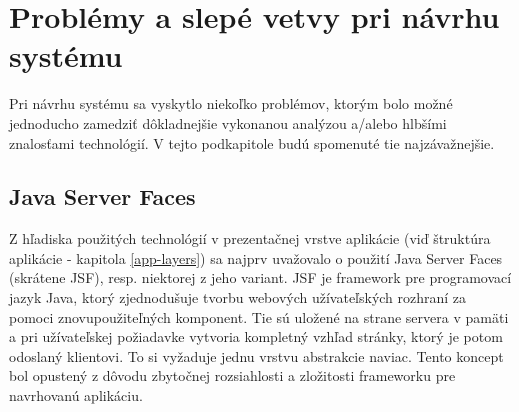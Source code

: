 \documentclass[12pt,oneside]{fithesis2}
\begin{document}
	\section{Problémy a slepé vetvy pri návrhu systému}
       		
	\par Pri návrhu systému sa vyskytlo niekoľko problémov, ktorým bolo možné jednoducho zamedziť dôkladnejšie vykonanou analýzou a/alebo hlbšími znalosťami technológií. V tejto podkapitole budú spomenuté tie najzávažnejšie.
	
	\subsection{Java Server Faces}
	
	\par Z hľadiska použitých technológií v prezentačnej vrstve aplikácie (viď štruktúra aplikácie - kapitola \ref{app-layers}) sa najprv uvažovalo o použití Java Server Faces (skrátene JSF), resp. niektorej z jeho variant. JSF je framework pre programovací jazyk Java, ktorý zjednodušuje tvorbu webových užívateľských rozhraní za pomoci znovupoužiteľných komponent. Tie sú uložené na strane servera v pamäti a pri užívateľskej požiadavke vytvoria kompletný vzhľad stránky, ktorý je potom odoslaný klientovi. To si vyžaduje jednu vrstvu abstrakcie naviac\cite{hades14}. Tento koncept bol opustený z dôvodu zbytočnej rozsiahlosti a zložitosti frameworku pre navrhovanú aplikáciu.
\end{document}
